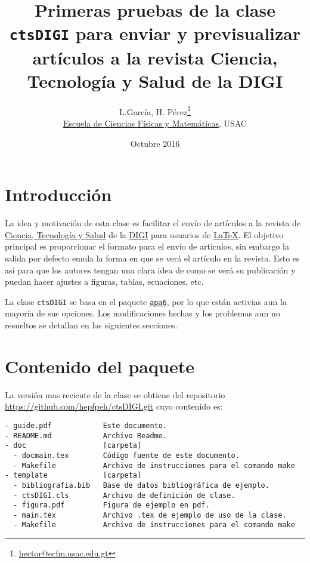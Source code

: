 \documentclass{article}
\title{Primeras pruebas de la clase \texttt{ctsDIGI} para enviar y previsualizar artículos a la revista Ciencia, Tecnología y Salud de la DIGI}
\author{L.García, H. Pérez\footnote{\href{mailto:hector@ecfm.usac.edu.gt}{hector@ecfm.usac.edu.gt}}\\\small{\href{http://ecfm.usac.edu.gt}{Escuela de Ciencias Físicas y Matemáticas}, USAC}}
\date{Octubre 2016}
\begin{document}
\maketitle



\section{Introducción}
La idea y motivación de esta clase es facilitar el envío de artículos a la revista de \href{http://digi.usac.edu.gt/ojsrevistas/index.php/cytes}{Ciencia, Tecnología y Salud} de la \href{http://digi.usac.edu.gt/}{DIGI} para usuarios de \href{https://www.latex-project.org/}{\LaTeX}. 
El objetivo principal es proporcionar el formato para el envío de artículos, sin embargo la salida por defecto  emula la forma en que se verá el artículo en la revista. Esto es así para que los autores tengan una clara idea de como se verá su publicación y puedan hacer ajustes a figuras, tablas, ecuaciones, etc.

La clase \texttt{ctsDIGI} se basa en el paquete \href{https://www.ctan.org/pkg/apa6}{\texttt{apa6}}, por lo que están activias aun la mayoría de sus opciones. Los modificaciones hechas y los problemas aun no resueltos se detallan en las siguientes secciones.

\section{Contenido del paquete}
La versión mas reciente de la clase se obtiene del repositorio \href{https://github.com/hepfpeh/ctsDIGI.git}{https://github.com/hepfpeh/ctsDIGI.git} cuyo contenido es:
\begin{verbatim}
- guide.pdf            Este documento.
- README.md            Archivo Readme.
- doc                  [carpeta]
  - docmain.tex        Código fuente de este documento.
  - Makefile           Archivo de instrucciones para el comando make
- template             [carpeta]
  - bibliografia.bib   Base de datos bibliográfica de ejemplo.
  - ctsDIGI.cls        Archivo de definición de clase.
  - figura.pdf         Figura de ejemplo en pdf.           
  - main.tex           Archivo .tex de ejemplo de uso de la clase.
  - Makefile           Archivo de instrucciones para el comando make
\end{verbatim}
\end{document}
